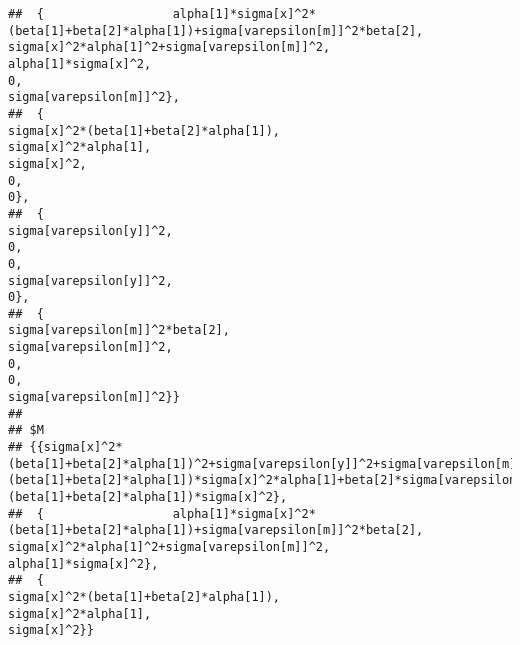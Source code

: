 \documentclass[
]{book}
\theoremstyle{definition}
\theoremstyle{definition}
\theoremstyle{definition}
\theoremstyle{remark}
\begin{document}
\begin{verbatim}
##  {                  alpha[1]*sigma[x]^2*(beta[1]+beta[2]*alpha[1])+sigma[varepsilon[m]]^2*beta[2],                                                    sigma[x]^2*alpha[1]^2+sigma[varepsilon[m]]^2,                                                                             alpha[1]*sigma[x]^2,                                                                                               0,                                                                          sigma[varepsilon[m]]^2},
##  {                                                          sigma[x]^2*(beta[1]+beta[2]*alpha[1]),                                                                             sigma[x]^2*alpha[1],                                                                                      sigma[x]^2,                                                                                               0,                                                                                               0},
##  {                                                                         sigma[varepsilon[y]]^2,                                                                                               0,                                                                                               0,                                                                          sigma[varepsilon[y]]^2,                                                                                               0},
##  {                                                                 sigma[varepsilon[m]]^2*beta[2],                                                                          sigma[varepsilon[m]]^2,                                                                                               0,                                                                                               0,                                                                          sigma[varepsilon[m]]^2}} 
## 
## $M
## {{sigma[x]^2*(beta[1]+beta[2]*alpha[1])^2+sigma[varepsilon[y]]^2+sigma[varepsilon[m]]^2*beta[2]^2,                   (beta[1]+beta[2]*alpha[1])*sigma[x]^2*alpha[1]+beta[2]*sigma[varepsilon[m]]^2,                                                           (beta[1]+beta[2]*alpha[1])*sigma[x]^2},
##  {                  alpha[1]*sigma[x]^2*(beta[1]+beta[2]*alpha[1])+sigma[varepsilon[m]]^2*beta[2],                                                    sigma[x]^2*alpha[1]^2+sigma[varepsilon[m]]^2,                                                                             alpha[1]*sigma[x]^2},
##  {                                                          sigma[x]^2*(beta[1]+beta[2]*alpha[1]),                                                                             sigma[x]^2*alpha[1],                                                                                      sigma[x]^2}}
\end{verbatim}
\end{document}
